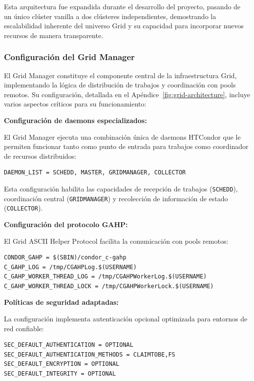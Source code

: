 Esta arquitectura fue expandida durante el desarrollo del proyecto, pasando de un único clúster vanilla a dos clústeres independientes, demostrando la escalabilidad inherente del universo Grid y su capacidad para incorporar nuevos recursos de manera transparente.

\subsubsection{Configuración del Grid Manager}
\noindent

El Grid Manager constituye el componente central de la infraestructura Grid, implementando la lógica de distribución de trabajos y coordinación con pools remotos. Su configuración, detallada en el Apéndice~\ref{fig:grid-architecture}, incluye varios aspectos críticos para su funcionamiento:

\textbf{Configuración de daemons especializados:}

El Grid Manager ejecuta una combinación única de daemons HTCondor que le permiten funcionar tanto como punto de entrada para trabajos como coordinador de recursos distribuidos:

\begin{verbatim}
DAEMON_LIST = SCHEDD, MASTER, GRIDMANAGER, COLLECTOR
\end{verbatim}

Esta configuración habilita las capacidades de recepción de trabajos (\texttt{SCHEDD}), coordinación central (\texttt{GRIDMANAGER}) y recolección de información de estado (\texttt{COLLECTOR}).

\textbf{Configuración del protocolo GAHP:}

El Grid ASCII Helper Protocol facilita la comunicación con pools remotos:

\begin{verbatim}
CONDOR_GAHP = $(SBIN)/condor_c-gahp
C_GAHP_LOG = /tmp/CGAHPLog.$(USERNAME)
C_GAHP_WORKER_THREAD_LOG = /tmp/CGAHPWorkerLog.$(USERNAME)
C_GAHP_WORKER_THREAD_LOCK = /tmp/CGAHPWorkerLock.$(USERNAME)
\end{verbatim}

\textbf{Políticas de seguridad adaptadas:}

La configuración implementa autenticación opcional optimizada para entornos de red confiable:

\begin{verbatim}
SEC_DEFAULT_AUTHENTICATION = OPTIONAL
SEC_DEFAULT_AUTHENTICATION_METHODS = CLAIMTOBE,FS
SEC_DEFAULT_ENCRYPTION = OPTIONAL
SEC_DEFAULT_INTEGRITY = OPTIONAL
\end{verbatim}

